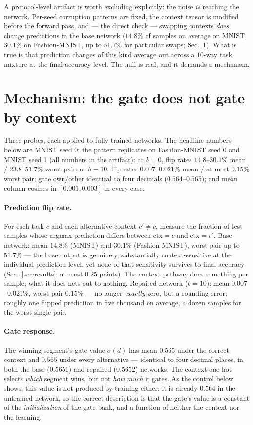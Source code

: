 \documentclass[10pt]{article}
\begin{document}
A protocol-level artifact is worth excluding explicitly: the noise
\emph{is} reaching the network. Per-seed corruption patterns are fixed,
the context tensor is modified before the forward pass, and --- the
direct check --- swapping contexts \emph{does} change predictions in the
base network ($14.8\%$ of samples on average on MNIST, $30.1\%$ on
Fashion-MNIST, up to $51.7\%$ for particular swaps;
Sec.~\ref{sec:mech}). What is true is that prediction changes of this
kind average out across a $10$-way task mixture at the final-accuracy
level. The null is real, and it demands a mechanism.



\section{Mechanism: the gate does not gate by context}
\label{sec:mech}

Three probes, each applied to fully trained networks. The headline
numbers below are MNIST seed 0; the pattern replicates on Fashion-MNIST
seed 0 and MNIST seed 1 (all numbers in the artifact): at $b{=}0$,
flip rates $14.8$--$30.1\%$ mean / $23.8$--$51.7\%$ worst pair; at
$b{=}10$, flip rates $0.007$--$0.021\%$ mean / at most $0.15\%$ worst
pair; gate own/other identical to four decimals ($0.564$--$0.565$); and
mean column cosines in $[0.001, 0.003]$ in every case.

\paragraph{Prediction flip rate.} For each task $c$ and each alternative
context $c' \ne c$, measure the fraction of test samples whose argmax
prediction differs between $\mathrm{ctx}{=}c$ and $\mathrm{ctx}{=}c'$.
Base network: mean $14.8\%$ (MNIST) and $30.1\%$ (Fashion-MNIST), worst
pair up to $51.7\%$ --- the base output is genuinely, substantially
context-sensitive at the individual-prediction level, yet none of that
sensitivity survives to final accuracy (Sec.~\ref{sec:results}: at most
$0.25$ points). The context pathway does something per sample; what it
does nets out to nothing. Repaired network ($b{=}10$): mean
$0.007$--$0.021\%$, worst pair $0.15\%$ --- no longer \emph{exactly}
zero, but a rounding error: roughly one flipped prediction in five
thousand on average, a dozen samples for the worst single pair.

\paragraph{Gate response.} The winning segment's gate value
$\sigma(d)$ has mean $0.565$ under the correct context and $0.565$
under every alternative --- identical to four decimal places, in both
the base ($0.5651$) and repaired ($0.5652$) networks. The context
one-hot selects \emph{which} segment wins, but not \emph{how much} it
gates. As the control below shows, this value is not produced by
training either: it is already $0.564$ in the untrained network, so the
correct description is that the gate's value is a constant of the
\emph{initialization} of the gate bank, and a function of neither the
context nor the learning.
\end{document}
